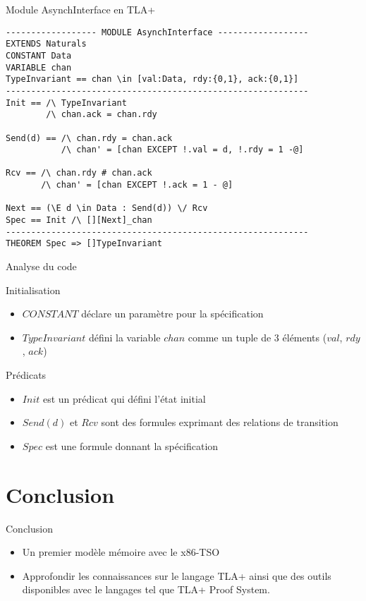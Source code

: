 \documentclass{beamer}
\begin{document}
\begin{frame}[containsverbatim]{Module AsynchInterface en TLA+}
\begin{lstlisting}[frame=single, basicstyle=\scriptsize]
------------------ MODULE AsynchInterface ------------------
EXTENDS Naturals
CONSTANT Data
VARIABLE chan
TypeInvariant == chan \in [val:Data, rdy:{0,1}, ack:{0,1}]
------------------------------------------------------------
Init == /\ TypeInvariant
        /\ chan.ack = chan.rdy
        
Send(d) == /\ chan.rdy = chan.ack
           /\ chan' = [chan EXCEPT !.val = d, !.rdy = 1 -@]
           
Rcv == /\ chan.rdy # chan.ack
       /\ chan' = [chan EXCEPT !.ack = 1 - @]

Next == (\E d \in Data : Send(d)) \/ Rcv
Spec == Init /\ [][Next]_chan
------------------------------------------------------------
THEOREM Spec => []TypeInvariant       

\end{lstlisting}
\end{frame}

\begin{frame}{Analyse du code}
	\begin{block}{Initialisation}
		\begin{itemize}
			\item $CONSTANT$ déclare un paramètre pour la spécification
			\item $TypeInvariant$ défini la variable $chan$ comme un tuple de 3 éléments ($val$, $rdy$, $ack$)
		\end{itemize}	
	\end{block}		
	\begin{block}{Prédicats}
		\begin{itemize}
			\item $Init$ est un prédicat qui défini l'état initial
			\item $Send(d)$ et $Rcv$ sont des formules exprimant des relations de transition
			\item $Spec$ est une formule donnant la spécification
		\end{itemize}	
	\end{block}		
\end{frame}

\section{Conclusion}
\begin{frame}{Conclusion}
	\begin{itemize}
		\item Un premier modèle mémoire avec le x86-TSO
		\item Approfondir les connaissances sur le langage TLA+ ainsi que des outils disponibles avec le langages tel que TLA+ Proof System.
	\end{itemize}
\end{frame}
\end{document}
